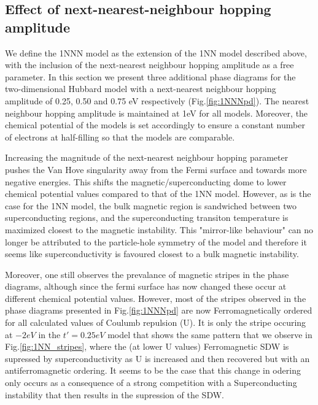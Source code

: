 \documentclass[12pt]{article}
\begin{document}
\subsection{Effect of next-nearest-neighbour hopping amplitude }

We define the 1NNN model as the extension of the 1NN model described above, with the inclusion of the next-nearest neighbour hopping amplitude as a free parameter.
In this section we present three additional phase diagrams for the two-dimensional Hubbard model with  a next-nearest neighbour hopping amplitude of 0.25, 0.50 and 0.75 eV respectively (Fig.\ref{fig:1NNNpd}).
The nearest neighbour hopping amplitude is maintained at 1eV for all models. Moreover, the chemical potential of the models is set accordingly to ensure a constant number of electrons at half-filling so that the models are comparable. \par

\medskip
\noindent Increasing the magnitude of the next-nearest neighbour hopping parameter pushes the Van Hove singularity away from the Fermi surface and towards more negative energies. This shifts the magnetic/superconducting dome to lower chemical potential values compared to that of the 1NN model.
However, as is the case for the 1NN model, the bulk magnetic region is sandwiched between two superconducting regions, and the superconducting transiton temperature is maximized closest to the magnetic instability. This "mirror-like behaviour" can no longer be attributed to the particle-hole symmetry of the model and therefore it seems like superconductivity is favoured closest to a bulk magnetic instability. \par 
\medskip
\noindent Moreover, one still observes the prevalance of magnetic stripes in the phase diagrams, although since the fermi surface has now changed these occur at different chemical potential values.  
However, most of the stripes observed in the phase diagrams presented in Fig.\ref{fig:1NNNpd} are now Ferromagnetically ordered for all calculated values of  Coulumb repulsion (U). It is only the stripe occuring at $-2eV$ in the $t'=0.25eV$ model that shows the  
same pattern that we observe in Fig.\ref{fig:1NN_stripes}, where the (at lower U values) Ferromagnetic SDW is supressed by superconductivity as U is increased
and then recovered but with an antiferromagnetic ordering. It seems to be the case that this change in odering only occurs as a consequence of a strong competition with a Superconducting instability that then results in the supression of the SDW. 
\end{document}
